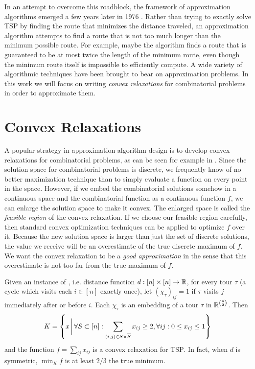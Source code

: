 In an attempt to overcome this roadblock, the framework of approximation algorithms emerged a few years later in 1976 \cite{SG76}. Rather than trying to exactly solve \textsc{TSP} by finding the route that minimizes the distance traveled, an approximation algorithm attempts to find a route that is not too much longer than the minimum possible route. For example, maybe the algorithm finds a route that is guaranteed to be at most twice the length of the minimum route, even though the minimum route itself is impossible to efficiently compute. A wide variety of algorithmic techniques have been brought to bear on approximation problems. In this work we will focus on writing \emph{convex relaxations} for combinatorial problems in order to approximate them.

\section{Convex Relaxations}
A popular strategy in approximation algorithm design is to develop convex relaxations for combinatorial problems, as can be seen for example in \cite{GW95,VY99,ARV09,Li13}.
Since the solution space for combinatorial problems is discrete, we frequently know of no better maximization technique than to simply evaluate a function on every point in the space. However, if we embed the combinatorial solutions somehow in a continuous space and the combinatorial function as a continuous function $f$, we can enlarge the solution space to make it convex. The enlarged space is called the \emph{feasible region} of the convex relaxation. If we choose our feasible region carefully, then standard convex optimization techniques can be applied to optimize $f$ over it. Because the new solution space is larger than just the set of discrete solutions, the value we receive will be an overestimate of the true discrete maximum of $f$. We want the convex relaxation to be a \emph{good approximation} in the sense that this overestimate is not too far from the true maximum of $f$.

\begin{example}
Given an instance of , i.e. distance function $d: [n] \times [n] \rightarrow \mathbb R$, for every tour $\tau$ (a cycle which visits each $i \in [n]$ exactly once), let $(\chi_\tau)_{ij} = 1$ if $\tau$ visits $j$ immediately after or before $i$. Each $\chi_\tau$ is an embedding of a tour $\tau$ in $\mathbb R^{\binom{n}{2}}$. Then
\[K = \left\{x \, \bigg{|} \, \forall S \subset [n]: \sum_{(i,j) \in S \times \overline{S}} x_{ij} \geq 2, \forall ij: 0 \leq x_{ij} \leq 1\right\}\]
and the function $f = \sum_{ij} x_{ij}$ is a convex relaxation for \textsc{TSP}. In fact, when $d$ is symmetric, $\min_K f$ is at least $2/3$ the true minimum.
\end{example}

